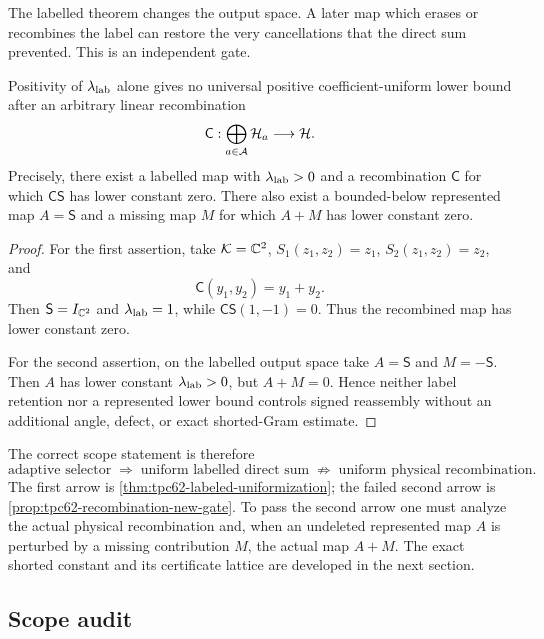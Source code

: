 The labelled theorem changes the output space.  A later map which erases
or recombines the label can restore the very cancellations that the direct
sum prevented.  This is an independent gate.

\begin{proposition}
\label{prop:tpc62-recombination-new-gate}
Positivity of \(\lambda_{\rm lab}\) alone gives no universal positive
coefficient-uniform lower bound after an arbitrary linear recombination
\[
 \mathsf C:\bigoplus_{a\in\mathcal A}\mathcal H_a\longrightarrow\mathcal H.
\]
Precisely, there exist a labelled map with \(\lambda_{\rm lab}>0\) and a
recombination \(\mathsf C\) for which \(\mathsf C\mathsf S\) has lower
constant zero.  There also exist a bounded-below represented map
\(A=\mathsf S\) and a missing map \(M\) for which \(A+M\) has lower
constant zero.
\end{proposition}

\begin{proof}
For the first assertion, take \(\mathcal K=\mathbb C^2\),
\(S_1(z_1,z_2)=z_1\), \(S_2(z_1,z_2)=z_2\), and
\[
 \mathsf C(y_1,y_2)=y_1+y_2.
\]
Then \(\mathsf S=I_{\mathbb C^2}\) and \(\lambda_{\rm lab}=1\), while
\(\mathsf C\mathsf S(1,-1)=0\).  Thus the recombined map has lower
constant zero.

For the second assertion, on the labelled output space take
\(A=\mathsf S\) and \(M=-\mathsf S\).  Then \(A\) has lower constant
\(\lambda_{\rm lab}>0\), but \(A+M=0\).  Hence neither label retention
nor a represented lower bound controls signed reassembly without an
additional angle, defect, or exact shorted-Gram estimate.
\end{proof}

The correct scope statement is therefore
\begin{equation}
 \boxed{
 \text{adaptive selector}
 \;\Longrightarrow\;
 \text{uniform labelled direct sum}
 \;\not\Longrightarrow\;
 \text{uniform physical recombination}.}
 \label{eq:tpc62-selector-scope-chain}
\end{equation}
The first arrow is
\cref{thm:tpc62-labeled-uniformization}; the failed second arrow is
\cref{prop:tpc62-recombination-new-gate}.  To pass the second arrow one
must analyze the actual physical recombination and, when an undeleted
represented map \(A\) is perturbed by a missing contribution \(M\), the
actual map \(A+M\).  The exact shorted constant and its certificate
lattice are developed in the next section.

\subsection{Scope audit}

